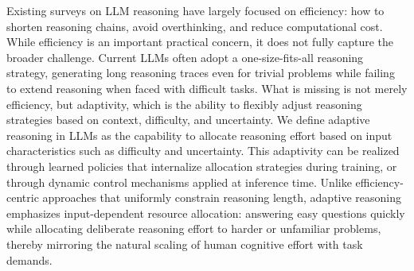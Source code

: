 \documentclass[11pt]{article}
\begin{document}
Existing surveys on LLM reasoning have largely focused on efficiency: how to shorten reasoning chains, avoid overthinking, and reduce computational cost. While efficiency is an important practical concern, it does not fully capture the broader challenge. Current LLMs often adopt a one-size-fits-all reasoning strategy, generating long reasoning traces even for trivial problems while failing to extend reasoning when faced with difficult tasks. What is missing is not merely efficiency, but adaptivity, which is the ability to flexibly adjust reasoning strategies based on context, difficulty, and uncertainty. We define adaptive reasoning in LLMs as the capability to allocate reasoning effort based on input characteristics such as difficulty and uncertainty. This adaptivity can be realized through learned policies that internalize allocation strategies during training, or through dynamic control mechanisms applied at inference time. Unlike efficiency-centric approaches that uniformly constrain reasoning length, adaptive reasoning emphasizes input-dependent resource allocation: answering easy questions quickly while allocating deliberate reasoning effort to harder or unfamiliar problems, thereby mirroring the natural scaling of human cognitive effort with task demands.
\end{document}
